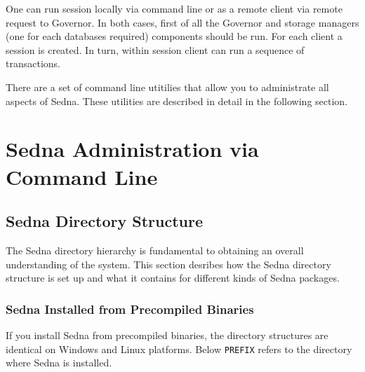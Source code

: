 \documentclass[a4paper,12pt]{article}
\begin{document}
One can run session locally via command line or as a remote client via remote request to Governor. In both cases, first of all the Governor and storage managers (one for each databases required) components should be run. For each client a session is created. In turn, within session client can run a sequence of transactions.



There are a set of command line utitilies that allow you to administrate all aspects of Sedna.
These utilities are described in detail in the following section.

\section{Sedna Administration via Command Line}

\subsection{Sedna Directory Structure}
\label{sec:dir-structure}
The Sedna directory hierarchy is fundamental to obtaining an overall understanding of the system. This section desribes 
how the Sedna directory structure is set up and what it contains for different kinds of Sedna packages.

\subsubsection{Sedna Installed from Precompiled Binaries}
\label{sec:binary-pack}
If you install Sedna from precompiled binaries, the directory structures are identical on Windows and Linux platforms.
Below \verb!PREFIX! refers to the directory where Sedna is installed.
\end{document}
